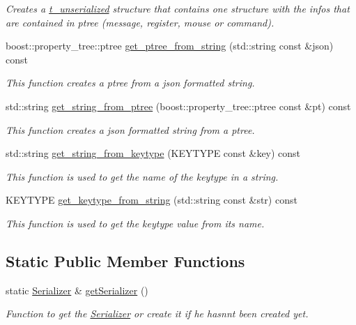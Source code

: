 \begin{DoxyCompactItemize}
\begin{DoxyCompactList}\small\item\em Creates a \hyperlink{structt__unserialized}{t\+\_\+unserialized} structure that contains one structure with the infos that are contained in ptree (message, register, mouse or command). \end{DoxyCompactList}\item 
boost\+::property\+\_\+tree\+::ptree \hyperlink{classspider_1_1_serializer_a8c998904275aa15bb1b114fe8a82be50}{get\+\_\+ptree\+\_\+from\+\_\+string} (std\+::string const \&json) const
\begin{DoxyCompactList}\small\item\em This function creates a ptree from a json formatted string. \end{DoxyCompactList}\item 
std\+::string \hyperlink{classspider_1_1_serializer_ab7253d1d906ea8cfc5921a06e9a31263}{get\+\_\+string\+\_\+from\+\_\+ptree} (boost\+::property\+\_\+tree\+::ptree const \&pt) const
\begin{DoxyCompactList}\small\item\em This function creates a json formatted string from a ptree. \end{DoxyCompactList}\item 
std\+::string \hyperlink{classspider_1_1_serializer_a63becae2837c0f731ee95da9abadcc58}{get\+\_\+string\+\_\+from\+\_\+keytype} (K\+E\+Y\+T\+Y\+PE const \&key) const
\begin{DoxyCompactList}\small\item\em This function is used to get the name of the keytype in a string. \end{DoxyCompactList}\item 
K\+E\+Y\+T\+Y\+PE \hyperlink{classspider_1_1_serializer_a7cf640d978492cc59889778c108759b0}{get\+\_\+keytype\+\_\+from\+\_\+string} (std\+::string const \&str) const
\begin{DoxyCompactList}\small\item\em This function is used to get the keytype value from its name. \end{DoxyCompactList}\end{DoxyCompactItemize}
\subsection*{Static Public Member Functions}
\begin{DoxyCompactItemize}
\item 
static \hyperlink{classspider_1_1_serializer}{Serializer} \& \hyperlink{classspider_1_1_serializer_aaadf4a402a583583667757408d60d4d7}{get\+Serializer} ()
\begin{DoxyCompactList}\small\item\em Function to get the \hyperlink{classspider_1_1_serializer}{Serializer} or create it if he hasnn\textquotesingle{}t been created yet. \end{DoxyCompactList}\end{DoxyCompactItemize}


